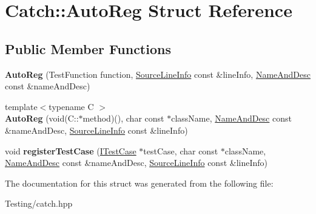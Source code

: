 \hypertarget{struct_catch_1_1_auto_reg}{\section{Catch\-:\-:Auto\-Reg Struct Reference}
\label{struct_catch_1_1_auto_reg}
}
\subsection*{Public Member Functions}
\begin{DoxyCompactItemize}
\item 
\hypertarget{struct_catch_1_1_auto_reg_af224f4568d57b8652474df475a164a8c}{{\bfseries Auto\-Reg} (Test\-Function function, \hyperlink{struct_catch_1_1_source_line_info}{Source\-Line\-Info} const \&line\-Info, \hyperlink{struct_catch_1_1_name_and_desc}{Name\-And\-Desc} const \&name\-And\-Desc)}\label{struct_catch_1_1_auto_reg_af224f4568d57b8652474df475a164a8c}

\item 
\hypertarget{struct_catch_1_1_auto_reg_a1bf9207fe0a02b46dc0ab1cc03cbe738}{{\footnotesize template$<$typename C $>$ }\\{\bfseries Auto\-Reg} (void(C\-::$\ast$method)(), char const $\ast$class\-Name, \hyperlink{struct_catch_1_1_name_and_desc}{Name\-And\-Desc} const \&name\-And\-Desc, \hyperlink{struct_catch_1_1_source_line_info}{Source\-Line\-Info} const \&line\-Info)}\label{struct_catch_1_1_auto_reg_a1bf9207fe0a02b46dc0ab1cc03cbe738}

\item 
\hypertarget{struct_catch_1_1_auto_reg_a2dc6a03e838b31e29fcd6a740195b55b}{void {\bfseries register\-Test\-Case} (\hyperlink{struct_catch_1_1_i_test_case}{I\-Test\-Case} $\ast$test\-Case, char const $\ast$class\-Name, \hyperlink{struct_catch_1_1_name_and_desc}{Name\-And\-Desc} const \&name\-And\-Desc, \hyperlink{struct_catch_1_1_source_line_info}{Source\-Line\-Info} const \&line\-Info)}\label{struct_catch_1_1_auto_reg_a2dc6a03e838b31e29fcd6a740195b55b}

\end{DoxyCompactItemize}


The documentation for this struct was generated from the following file\-:\begin{DoxyCompactItemize}
\item 
Testing/catch.\-hpp\end{DoxyCompactItemize}

